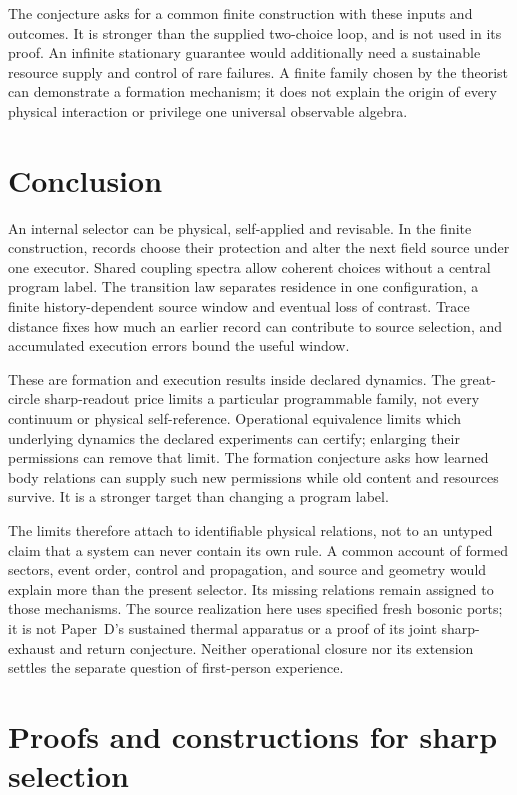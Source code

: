 \documentclass[12pt,a4paper]{article}
\begin{document}
The conjecture asks for a common finite construction with these inputs and outcomes. It is stronger than the supplied two-choice loop, and is not used in its proof. An infinite stationary guarantee would additionally need a sustainable resource supply and control of rare failures. A finite family chosen by the theorist can demonstrate a formation mechanism; it does not explain the origin of every physical interaction or privilege one universal observable algebra.

\section{Conclusion}
\label{sec:conclusion}
\label{sec:nonclaims}

An internal selector can be physical, self-applied and revisable.
In the finite construction, records choose their protection and alter
the next field source under one executor. Shared coupling spectra allow
coherent choices without a central program label. The transition law
separates residence in one configuration, a finite history-dependent
source window and eventual loss of contrast. Trace distance fixes how
much an earlier record can contribute to source selection, and accumulated
execution errors bound the useful window.

These are formation and execution results inside declared dynamics.
The great-circle sharp-readout price limits a particular programmable
family, not every continuum or physical self-reference. Operational
equivalence limits which underlying dynamics the declared experiments can
certify; enlarging their permissions can remove that limit.
The formation conjecture asks how learned body relations can supply such
new permissions while old content and resources survive.
It is a stronger target than changing a program label.

The limits therefore attach to identifiable physical relations, not to an
untyped claim that a system can never contain its own rule.
A common account of formed sectors, event order, control and propagation,
and source and geometry would explain more than the present selector.
Its missing relations remain assigned to those mechanisms.
The source realization here uses specified fresh bosonic ports; it is not
Paper~D's sustained thermal apparatus or a proof of its joint sharp-exhaust
and return conjecture. Neither operational closure nor its extension
settles the separate question of first-person experience.

\appendix
\section{Proofs and constructions for sharp selection}
\label{app:sharp}
\end{document}

